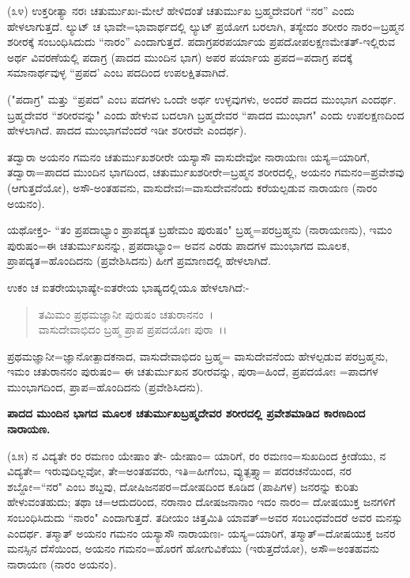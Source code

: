(೩೪) ಉಕ್ತರೀತ್ಯಾ ನರಃ ಚತುರ್ಮುಖಃ-ಮೇಲೆ ಹೇಳಿದಂತೆ ಚತುರ್ಮುಖ ಬ್ರಹ್ಮದೇವರಿಗೆ ``ನರ'' ಎಂದು ಹೇಳಲಾಗುತ್ತದೆ. ಲ್ಯುಟ್ ಚ ಭಾವೇ=ಭಾವಾರ್ಥದಲ್ಲಿ ಲ್ಯುಟ್ ಪ್ರಯೋಗ ಬರಲಾಗಿ, ತಸ್ಯೇದಂ ಶರೀರಂ ನಾರಂ=ಬ್ರಹ್ಮನ ಶರೀರಕ್ಕೆ ಸಂಬಂಧಿಸಿದುದು ``ನಾರಂ'' ಎಂದಾಗುತ್ತದೆ. ಪದಾಗ್ರಪರಪರ್ಯಾಯ ಪ್ರಪದೋಪಲಕ್ಷಣಮೇತತ್-ಇಲ್ಲಿರುವ ಅರ್ಥ ವಿವರಣೆಯಲ್ಲಿ ಪದಾಗ್ರ (ಪಾದದ ಮುಂದಿನ ಭಾಗ) ಅಪರ ಪರ್ಯಾಯ ಪ್ರಪದ=ಪದಾಗ್ರ ಪದಕ್ಕೆ ಸಮಾನಾರ್ಥವುಳ್ಳ ``ಪ್ರಪದ' ಎಂಬ ಪದದಿಂದ ಉಪಲಕ್ಷಿತವಾಗಿದೆ.

("ಪದಾಗ್ರ" ಮತ್ತು ``ಪ್ರಪದ" ಎಂಬ ಪದಗಳು ಒಂದೇ ಅರ್ಥ ಉಳ್ಳವುಗಳು, ಅಂದರೆ ಪಾದದ ಮುಂಭಾಗ ಎಂದರ್ಥ. ಬ್ರಹ್ಮದೇವರ ``ಶರೀರವನ್ನು" ಎಂದು ಹೇಳುವ ಬದಲಾಗಿ ಬ್ರಹ್ಮದೇವರ ``ಪಾದದ ಮುಂಭಾಗ" ಎಂದು ಉಪಲಕ್ಷಣದಿಂದ ಹೇಳಲಾಗಿದೆ. ಪಾದದ ಮುಂಭಾಗವೆಂದರೆ ಇಡೀ ಶರೀರವೇ ಎಂದರ್ಥ).

ತದ್ವಾರಾ ಅಯನಂ ಗಮನಂ ಚತುರ್ಮುಖಶರೀರೇ ಯಸ್ಯಾಸೌ ವಾಸುದೇವೋ ನಾರಾಯಣಃ ಯಸ್ಯ=ಯಾರಿಗೆ, ತದ್ವಾರಾ=ಪಾದದ ಮುಂದಿನ ಭಾಗದಿಂದ, ಚತುರ್ಮುಖಶರೀರೇ=ಬ್ರಹ್ಮನ ಶರೀರದಲ್ಲಿ, ಅಯನಂ ಗಮನಂ=ಪ್ರವೇಶವು (ಆಗುತ್ತದೆಯೋ), ಅಸೌ-ಅಂತಹವನು, ವಾಸುದೇವಃ=ವಾಸುದೇವನೆಂದು ಕರೆಯಲ್ಪಡುವ ನಾರಾಯಣ (ನಾರಂ ಅಯನಂ).

ಯಥೋಕ್ತಂ- ``ತಂ ಪ್ರಪದಾಭ್ಯಾಂ ಪ್ರಾಪದ್ಯತ ಬ್ರಹೇಮಂ ಪುರುಷಂ" ಬ್ರಹ್ಮ=ಪರಬ್ರಹ್ಮನು (ನಾರಾಯಣನು), ಇಮಂ ಪುರುಷಂ=ಈ ಚತುರ್ಮುಖನನ್ನು, ಪ್ರಪದಾಭ್ಯಾಂ= ಅವನ ಎರಡು ಪಾದಗಳ ಮುಂಭಾಗದ ಮೂಲಕ, ಪ್ರಾಪದ್ಯತ=ಹೊಂದಿದನು (ಪ್ರವೇಶಿಸಿದನು) ಹೀಗೆ ಪ್ರಮಾಣದಲ್ಲಿ ಹೇಳಲಾಗಿದೆ.

ಉಕಂ ಚ ಐತರೇಯಭಾಷ್ಯೇ-ಐತರೇಯ ಭಾಷ್ಯದಲ್ಲಿಯೂ ಹೇಳಲಾಗಿದೆ:-

\begin{verse}
ತಮಿಮಂ ಪ್ರಥಮಜ್ಞಾನೀ ಪುರುಷಂ ಚತುರಾನನಂ~।\\ ವಾಸುದೇವಾಭಿದಂ ಬ್ರಹ್ಮ ಪ್ರಾಪ ಪ್ರಪದಯೋಃ ಪುರಾ~।।
\end{verse}

ಪ್ರಥಮಜ್ಞಾನೀ=ಜ್ಞಾನೋತ್ಪಾದಕನಾದ, ವಾಸುದೇವಾಭಿದಂ ಬ್ರಹ್ಮ= ವಾಸುದೇವನೆಂದು ಹೇಳಲ್ಪಡುವ ಪರಬ್ರಹ್ಮನು, ಇಮಂ ಚತುರಾನನಂ ಪುರುಷಂ= ಈ ಚತುರ್ಮುಖನ ಶರೀರವನ್ನು, ಪುರಾ=ಹಿಂದೆ, ಪ್ರಪದಯೋಃ =ಪಾದಗಳ ಮುಂಭಾಗದಿಂದ, ಪ್ರಾಪ=ಹೊಂದಿದನು (ಪ್ರವೇಶಿಸಿದನು).

\begin{center}
\textbf{ಪಾದದ ಮುಂದಿನ ಭಾಗದ ಮೂಲಕ ಚತುರ್ಮುಖಬ್ರಹ್ಮದೇವರ ಶರೀರದಲ್ಲಿ ಪ್ರವೇಶಮಾಡಿದ ಕಾರಣದಿಂದ ನಾರಾಯಣ.}
\end{center}

(೩೫) ನ ವಿದ್ಯತೇ ರಂ ರಮಣಂ ಯೇಷಾಂ ತೇ- ಯೇಷಾಂ= ಯಾರಿಗೆ, ರಂ ರಮಣಂ=ಸುಖದಿಂದ ಕ್ರೀಡೆಯು, ನ ವಿದ್ಯತೇ= ಇರುವುದಿಲ್ಲವೋ, ತೇ=ಅಂತಹವರು, ಇತಿ=ಹೀಗೆಂಬ, ವ್ಯುತ್ಪತ್ತ್ಯಾ= ಪದರಚನೆಯಿಂದ, ನರ ಶಬ್ದೋ=``ನರ" ಎಂಬ ಶಬ್ದವು, ದೋಷಿಜನಪರ=ದೋಷದಿಂದ ಕೂಡಿದ (ಪಾಪಿಗಳ) ಜನರನ್ನು ಕುರಿತು ಹೇಳುವಂತಹುದು; ತಥಾ ಚ=ಆದುದರಿಂದ, ನರಾನಾಂ ದೋಷಜನಾನಾಂ ಇದಂ ನಾರಂ= ದೋಷಯುಕ್ತ ಜನಗಳಿಗೆ ಸಂಬಂಧಿಸಿದುದು ``ನಾರಂ" ಎಂದಾಗುತ್ತದೆ. ತದೀಯಂ ಚಿತ್ತಮಿತಿ ಯಾವತ್=ಅವರ ಸಂಬಂಧವೆಂದರೆ ಅವರ ಮನಸ್ಸು ಎಂದರ್ಥ. ತಸ್ಮಾತ್ ಅಯನಂ ಗಮನಂ ಯಸ್ಯಾಸೌ ನಾರಾಯಣಃ- ಯಸ್ಯ=ಯಾರಿಗೆ, ತಸ್ಮಾತ್=ದೋಷಯುಕ್ತ ಜನರ ಮನಸ್ಸಿನ ದೆಸೆಯಿಂದ, ಅಯನಂ ಗಮನಂ=ಹೊರಗೆ ಹೋಗುವಿಕೆಯು (ಇರುತ್ತದೆಯೋ), ಅಸೌ=ಅಂತಹವನು ನಾರಾಯಣ (ನಾರಂ ಅಯನಂ).

